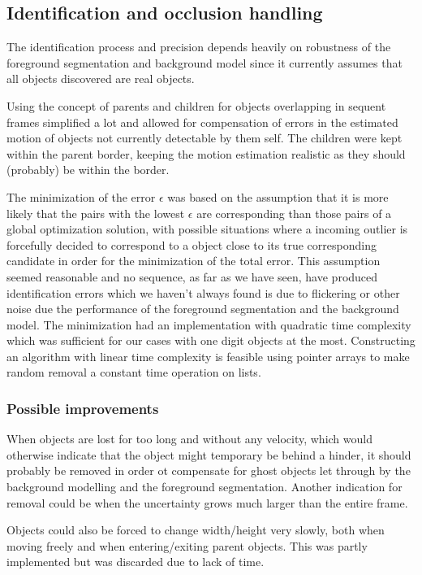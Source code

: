 \subsection{Identification and occlusion handling}
The identification process and precision depends heavily on robustness of the foreground segmentation and background model since it currently assumes that all objects discovered are real objects.

Using the concept of parents and children for objects overlapping in sequent frames simplified a lot and allowed for compensation of errors in the estimated motion of objects not currently detectable by them self. The children were kept within the parent border, keeping the motion estimation realistic as they should (probably) be within the border.

The minimization of the error $\epsilon$ was based on the assumption that it is more likely that the pairs with the lowest $\epsilon$ are corresponding than those pairs of a global optimization solution, with possible situations where a incoming outlier is forcefully decided to correspond to a object close to its true corresponding candidate in order for the minimization of the total error. This assumption seemed reasonable and no sequence, as far as we have seen, have produced identification errors which we haven't always found is due to flickering or other noise due the performance of the foreground segmentation and the background model.
The minimization had an implementation with quadratic time complexity which was sufficient for our cases with one digit objects at the most. Constructing an algorithm with linear time complexity is feasible using pointer arrays to make random removal a constant time operation on lists.

\subsubsection{Possible improvements}
When objects are lost for too long and without any velocity, which would otherwise indicate that the object might temporary be behind a hinder, it should probably be removed in order ot compensate for ghost objects let through by the background modelling and the foreground segmentation. Another indication for removal could be when the uncertainty grows much larger than the entire frame.

Objects could also be forced to change width/height very slowly, both when moving freely and when entering/exiting parent objects. This was partly implemented but was discarded due to lack of time.

